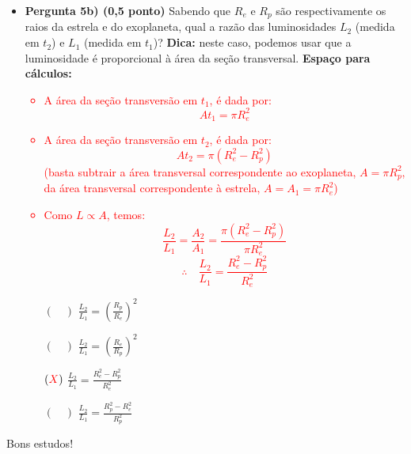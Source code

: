 \documentclass[a4paper, 12pt]{article}
\newcommand{\red}[1]{\textcolor{red}{#1}}
\begin{document}
\begin{flushleft}
\begin{itemize}
\begin{itemize}
\begin{multicols}{3}
\begin{figure}[H]
							\captionsetup{labelformat=empty}
							\caption{$(\red{X})$}
						\end{figure}
					\end{multicols}
				\item \textbf{Pergunta 5b) (0,5 ponto)} Sabendo que $R_e$ e $R_p$ são respectivamente os raios da estrela e do exoplaneta, qual a razão das luminosidades $L_2$ (medida em $t_2$) e $L_1$ (medida em $t_1$)? \linebreak
					\textbf{Dica:} neste caso, podemos usar que a luminosidade é proporcional à área da seção transversal. \linebreak
					\textbf{Espaço para cálculos:}
					\red{\begin{itemize}
						\item A área da seção transversão em $t_1$, é dada por:
							$$At_1 = \pi R_e^2$$
						\item A área da seção transversão em $t_2$, é dada por:
							$$At_2 = \pi (R_e^2-R_p^2)$$
							(basta subtrair a área transversal correspondente ao exoplaneta, $A=\pi R_p^2$, da área transversal correspondente à estrela, $A=A_1=\pi R_e^2$)
						\item Como $L \propto A$, temos:
							$$\frac{L_2}{L_1} = \frac{A_2}{A_1} = \frac{\pi (R_e^2-R_p^2)}{\pi R_e^2}$$
							$$\therefore \quad \frac{L_2}{L_1} = \frac{R_e^2-R_p^2}{R_e^2}$$
					\end{itemize}}
					\begin{multicols}{2} \begin{itemize}
						\item[$(\quad)$] $\frac{L_2}{L_1} = \left( \frac{R_p}{R_e} \right)^2$
						\item[$(\quad)$] $\frac{L_2}{L_1} = \left( \frac{R_e}{R_p} \right)^2 $
						\item[$(\red{X})$] $\frac{L_2}{L_1} = \frac{R_e^2-R_p^2}{R_e^2}$
						\item[$(\quad)$] $\frac{L_2}{L_1} = \frac{R_p^2-R_e^2}{R_p^2}$
					\end{itemize} \end{multicols}
			\end{itemize}
	\end{itemize}
	\end{flushleft}
	\begin{flushright}
		\begin{large}
			Bons estudos!
		\end{large}
	\end{flushright}
\end{document}
